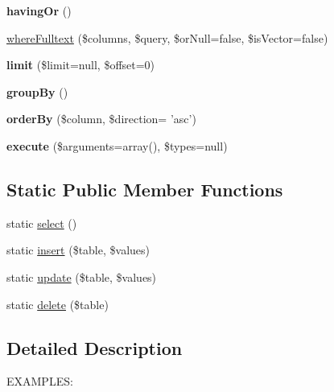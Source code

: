 \begin{DoxyCompactItemize}
\item 
\hypertarget{classQuery_a7810e3ea656afdda873b5985da14386b}{
{\bfseries havingOr} ()}
\label{classQuery_a7810e3ea656afdda873b5985da14386b}

\item 
\hyperlink{classQuery_a44bf1140a6525d7f7e82f7d47e93b87c}{whereFulltext} (\$columns, \$query, \$orNull=false, \$isVector=false)
\item 
\hypertarget{classQuery_ae9110a507cead8d0c57099aaab273799}{
{\bfseries limit} (\$limit=null, \$offset=0)}
\label{classQuery_ae9110a507cead8d0c57099aaab273799}

\item 
\hypertarget{classQuery_af8940f0c7aede42d1029995396d787ff}{
{\bfseries groupBy} ()}
\label{classQuery_af8940f0c7aede42d1029995396d787ff}

\item 
\hypertarget{classQuery_a89307b4afda564f5ea9afb0733007161}{
{\bfseries orderBy} (\$column, \$direction= 'asc')}
\label{classQuery_a89307b4afda564f5ea9afb0733007161}

\item 
\hypertarget{classQuery_aaffa7dab063581b36110f081a9a16ff8}{
{\bfseries execute} (\$arguments=array(), \$types=null)}
\label{classQuery_aaffa7dab063581b36110f081a9a16ff8}

\end{DoxyCompactItemize}
\subsection*{Static Public Member Functions}
\begin{DoxyCompactItemize}
\item 
static \hyperlink{classQuery_af2be941b80c1e376f373ff3d25928a70}{select} ()
\item 
static \hyperlink{classQuery_abbefb2e22d6caa9727832bd60ccb46db}{insert} (\$table, \$values)
\item 
static \hyperlink{classQuery_abcc72cbfecd4b301f964960dad0611e2}{update} (\$table, \$values)
\item 
static \hyperlink{classQuery_a5c5ec3da901616c9b405b686d3d338ab}{delete} (\$table)
\end{DoxyCompactItemize}


\subsection{Detailed Description}
EXAMPLES:

